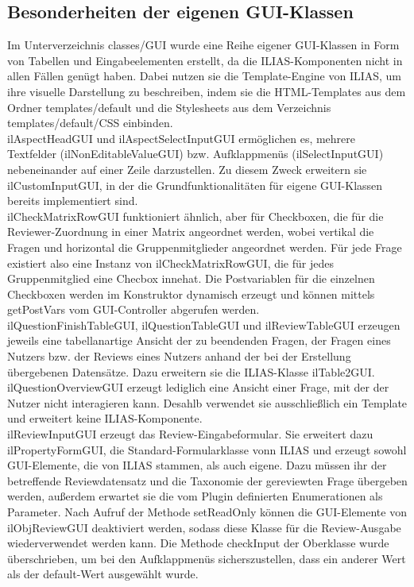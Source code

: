 \documentclass[a4paper]{scrreprt}
\begin{document}
\subsection{Besonderheiten der eigenen GUI-Klassen}
Im Unterverzeichnis classes/GUI wurde eine Reihe eigener GUI-Klassen in Form von Tabellen und Eingabeelementen erstellt, da die ILIAS-Komponenten nicht in allen Fällen genügt haben. Dabei nutzen sie die Template-Engine von ILIAS, um ihre visuelle Darstellung zu beschreiben, indem sie die HTML-Templates aus dem Ordner templates/default und die Stylesheets aus dem Verzeichnis templates/default/CSS einbinden.\\
ilAspectHeadGUI und ilAspectSelectInputGUI ermöglichen es, mehrere Textfelder (ilNonEditableValueGUI) bzw. Aufklappmenüs (ilSelectInputGUI) nebeneinander auf einer Zeile darzustellen. Zu diesem Zweck erweitern sie ilCustomInputGUI, in der die Grundfunktionalitäten für eigene GUI-Klassen bereits implementiert sind.\\
ilCheckMatrixRowGUI funktioniert ähnlich, aber für Checkboxen, die für die Reviewer-Zuordnung in einer Matrix angeordnet werden, wobei vertikal die Fragen und horizontal die Gruppenmitglieder angeordnet werden. Für jede Frage existiert also eine Instanz von ilCheckMatrixRowGUI, die für jedes Gruppenmitglied eine Checbox innehat. Die Postvariablen für die einzelnen Checkboxen werden im Konstruktor dynamisch erzeugt und können mittels getPostVars vom GUI-Controller abgerufen werden.\\
ilQuestionFinishTableGUI, ilQuestionTableGUI und ilReviewTableGUI erzeugen jeweils eine tabellanartige Ansicht der zu beendenden Fragen, der Fragen eines Nutzers bzw. der Reviews eines Nutzers anhand der bei der Erstellung übergebenen Datensätze. Dazu erweitern sie die ILIAS-Klasse ilTable2GUI.\\
ilQuestionOverviewGUI erzeugt lediglich eine Ansicht einer Frage, mit der der Nutzer nicht interagieren kann. Desahlb verwendet sie ausschließlich ein Template und erweitert keine ILIAS-Komponente.\\
ilReviewInputGUI erzeugt das Review-Eingabeformular. Sie erweitert dazu ilPropertyFormGUI, die Standard-Formularklasse vonn ILIAS und erzeugt sowohl GUI-Elemente, die von ILIAS stammen, als auch eigene. Dazu müssen ihr der betreffende Reviewdatensatz und die Taxonomie der gereviewten Frage übergeben werden, außerdem erwartet sie die vom Plugin definierten Enumerationen als Parameter. Nach Aufruf der Methode setReadOnly können die GUI-Elemente von ilObjReviewGUI deaktiviert werden, sodass diese Klasse für die Review-Ausgabe wiederverwendet werden kann. Die Methode checkInput der Oberklasse wurde überschrieben, um bei den Aufklappmenüs sicherszustellen, dass ein anderer Wert als der default-Wert ausgewählt wurde.\\
\end{document}
